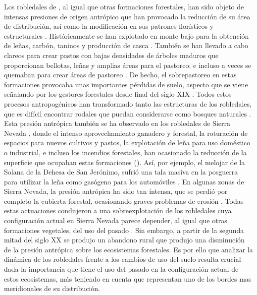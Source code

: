 Los robledales de \Qp, al igual que otras formaciones forestales, han sido objeto de intensas presiones de origen antrópico que han provocado la reducción de su área de distribución, así como la modificación en sus patrones florísticos y estructurales \autocites{Gavilanetal2000EffectsDisturbance,Gavilanetal2007ModellingCurrent,Tarregaetal2006ForestStructure}. Históricamente se han explotado en monte bajo para la obtención de leñas, carbón, taninos y producción de casca \autocite{RuizdelaTorre2006FloraMayor}. También se han llevado a cabo clareos para crear pastos con bajas densidades de árboles maduros que proporcionan bellotas, leñas y amplias áreas para el pastoreo; e incluso a veces se quemaban para crear áreas de pastoreo \autocite{ValbuenaCarabanaGil2017CentenaryCoppicing}. De hecho, el sobrepastoreo en estas formaciones provocaba unas importantes pérdidas de suelo, aspecto que se viene señalando por los gestores forestales desde final del siglo XIX \autocite{Laguna1872ComisionFlora}. Todos estos procesos antropogénicos han transformado tanto las estructuras de los robledales, que es difícil encontrar rodales que puedan considerarse como bosques naturales \autocite{RuizdelaTorre2006FloraMayor}. Esta presión antrópica también se ha observado en los robledales de Sierra Nevada \autocite{JimenezOlivencia1991PaisajesSierra}, donde el intenso aprovechamiento ganadero y forestal, la roturación de espacios para nuevos cultivos y pastos, la explotación de leña para uso doméstico o industrial, e incluso los incendios forestales, han ocasionado la reducción de la superficie que ocupaban estas formaciones \autocite{CamachoOlmedoetal2002AltaAlpujarra} (). Así, por ejemplo, el melojar de la Solana de la Dehesa de San Jerónimo, sufrió una tala masiva en la posguerra para utilizar la leña como gasógeno para los automóviles \autocite{Prieto1975BosquesSierra}. En algunas zonas de Sierra Nevada, la presión antrópica ha sido tan intensa, que se perdió por completo la cubierta forestal, ocasionando graves problemas de erosión \autocite{MesaGarrido2019ReforestacionSilvicultura,RomeroZurbano1909DivisionHidrologicoforestal}. Todas estas actuaciones condujeron a una sobreexplotación de los robledales cuya configuración actual en Sierra Nevada parece depender, al igual que otras formaciones vegetales, del uso del pasado \autocite{NavarroGonzalezetal2013WeightLanduse}. Sin embargo, a partir de la segunda mitad del siglo XX se produjo un abandono rural que produjo una disminución de la presión antrópica sobre los ecosistemas forestales. Es por ello que analizar la dinámica de los robledales frente a los cambios de uso del suelo resulta crucial dada la importancia que tiene el uso del pasado en la configuración actual de estos ecosistemas, más teniendo en cuenta que representan uno de los bordes mas meridionales de su distribución. 


